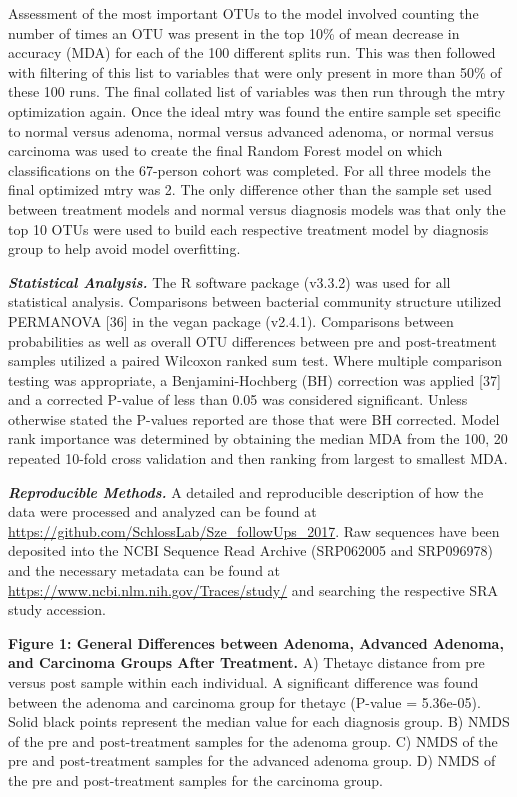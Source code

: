 \documentclass[12pt,]{article}
\begin{document}
Assessment of the most important OTUs to the model involved counting the
number of times an OTU was present in the top 10\% of mean decrease in
accuracy (MDA) for each of the 100 different splits run. This was then
followed with filtering of this list to variables that were only present
in more than 50\% of these 100 runs. The final collated list of
variables was then run through the mtry optimization again. Once the
ideal mtry was found the entire sample set specific to normal versus
adenoma, normal versus advanced adenoma, or normal versus carcinoma was
used to create the final Random Forest model on which classifications on
the 67-person cohort was completed. For all three models the final
optimized mtry was 2. The only difference other than the sample set used
between treatment models and normal versus diagnosis models was that
only the top 10 OTUs were used to build each respective treatment model
by diagnosis group to help avoid model overfitting.

\textbf{\emph{Statistical Analysis.}} The R software package (v3.3.2)
was used for all statistical analysis. Comparisons between bacterial
community structure utilized PERMANOVA {[}36{]} in the vegan package
(v2.4.1). Comparisons between probabilities as well as overall OTU
differences between pre and post-treatment samples utilized a paired
Wilcoxon ranked sum test. Where multiple comparison testing was
appropriate, a Benjamini-Hochberg (BH) correction was applied {[}37{]}
and a corrected P-value of less than 0.05 was considered significant.
Unless otherwise stated the P-values reported are those that were BH
corrected. Model rank importance was determined by obtaining the median
MDA from the 100, 20 repeated 10-fold cross validation and then ranking
from largest to smallest MDA.

\textbf{\emph{Reproducible Methods.}} A detailed and reproducible
description of how the data were processed and analyzed can be found at
\url{https://github.com/SchlossLab/Sze_followUps_2017}. Raw sequences
have been deposited into the NCBI Sequence Read Archive (SRP062005 and
SRP096978) and the necessary metadata can be found at
\url{https://www.ncbi.nlm.nih.gov/Traces/study/} and searching the
respective SRA study accession.

\newpage

\textbf{Figure 1: General Differences between Adenoma, Advanced Adenoma,
and Carcinoma Groups After Treatment.} A) Thetayc distance from pre
versus post sample within each individual. A significant difference was
found between the adenoma and carcinoma group for thetayc (P-value =
5.36e-05). Solid black points represent the median value for each
diagnosis group. B) NMDS of the pre and post-treatment samples for the
adenoma group. C) NMDS of the pre and post-treatment samples for the
advanced adenoma group. D) NMDS of the pre and post-treatment samples
for the carcinoma group.
\end{document}
